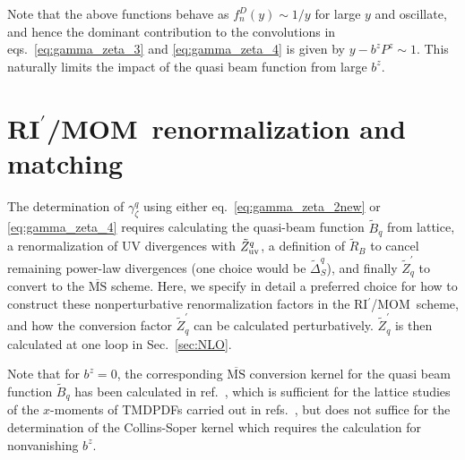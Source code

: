 \documentclass[11pt,a4paper]{article}
\DeclareRobustCommand{\eq}[1]{eq.~\eqref{eq:#1}}
\DeclareRobustCommand{\eqs}[2]{eqs.~\eqref{eq:#1} and \eqref{eq:#2}}
\DeclareRobustCommand{\sec}[1]{Sec.~\ref{sec:#1}}
\DeclareRobustCommand{\mycite}[1]{ref.~\cite{#1}}
\DeclareRobustCommand{\mycites}[1]{refs.~\cite{#1}}
\newcommand{\MS}{{\overline{\mathrm{MS}}}}
\newcommand{\cR}{{\tilde R}}
\newcommand{\RIpMOM}{RI$^\prime$/MOM}
\begin{document}
Note that the above functions  behave as $f_n^D(y) \sim 1/y$ for large $y$ and oscillate,
and hence the dominant contribution to the convolutions in \eqs{gamma_zeta_3}{gamma_zeta_4}
is given by $y - b^z P^z \sim 1$. This naturally limits the impact of the quasi beam function
from large $b^z$. 


\section{\texorpdfstring{\RIpMOM}{RI'/MOM}~renormalization and matching}
\label{sec:RIMOM}

The determination of $\gamma_\zeta^q$ using either \eq{gamma_zeta_2new} or \eqref{eq:gamma_zeta_4} requires calculating the quasi-beam function $\tilde B_q$ from lattice, a renormalization of UV divergences with $\tilde Z_{\rm uv}^q$, a definition of $\cR_B$ to cancel remaining power-law divergences (one choice would be $\tilde\Delta_S^q$), and finally $\tilde Z_q^\prime$ to convert to the $\MS$ scheme.
Here, we specify in detail a preferred choice for how to construct these nonperturbative renormalization factors in the \RIpMOM\ scheme, and how the conversion factor $\tilde Z_q^\prime$ can be calculated perturbatively.
$\tilde Z_q^\prime$  is then calculated at one loop in \sec{NLO}.

Note that for $b^z{=}0$, the corresponding $\MS$ conversion kernel for the quasi beam function $\tilde B_q$ has been calculated in \mycite{Constantinou:2019vyb}, which is sufficient for the lattice studies of the $x$-moments of TMDPDFs carried out in \mycites{Musch:2010ka,Musch:2011er,Engelhardt:2015xja,Yoon:2016dyh,Yoon:2017qzo}, but does not suffice for the determination of the Collins-Soper kernel which requires the calculation for nonvanishing $b^z$.
\end{document}
